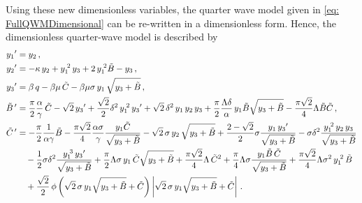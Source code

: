 Using these new dimensionless variables, the quarter wave model given in \cref{eq: FullQWMDimensional} can be re-written in a dimensionless form. Hence, the dimensionless quarter-wave model is described by
~
\begin{equation} \label{eq: FullQWMDimensionless}
\begin{split}
    \dash{y_1} &= y_2 \, , \\
    \dash{y_2} &= - \kappa \, y_2 + y_1\power{2} \, y_3 + 2 \, y_1\power{2} \tilde{B} - y_3 \, , \\
    \dash{y_3} &= \beta \, q - \beta \mu \, \tilde{C} - \beta \mu \sigma \, y_1 \, \sqrt{y_3 + \tilde{B}} \, , \\
    \dash{\tilde{B}\,} &= \frac{\pi}{2} \frac{\alpha}{\gamma} \, \tilde{C} - \sqrt{2} \, \dash{y_3} + \frac{\sqrt{2}}{2} \delta^2 \, y_1\power{2} \, \dash{y_3} + \sqrt{2} \, \delta^2 \, y_1 \, y_2 \, y_3 + \frac{\pi}{2} \frac{\Lambda \delta}{\alpha} \, y_1 \tilde{B} \sqrt{y_3 + \tilde{B}} - \frac{\pi \sqrt{2}}{4} \Lambda \tilde{B} \tilde{C} \, , \\
    \dash{\tilde{C}\,} &=
    - \frac{\pi}{2} \frac{1}{\alpha \gamma} \tilde{B}
    - \frac{\pi \sqrt{2}}{4} \frac{\alpha \sigma}{\gamma} \frac{y_1 \tilde{C}}{\sqrt{y_3 + \tilde{B}}}
    - \sqrt{2} \, \sigma \, y_2 \, \sqrt{y_3 + \tilde{B}}
    + \frac{2-\sqrt{2}}{2} \sigma \frac{y_1 \, \dash{y_3}}{\sqrt{y_3 + \tilde{B}}}
    - \sigma \delta^2 \frac{y_1\power{2} \, y_2 \, y_3}{\sqrt{y_3 + \tilde{B}}}
    \\ & \quad %
    - \frac{1}{2} \sigma \delta^2 \frac{y_1\power{3} \, \dash{y_3}}{\sqrt{y_3 + \tilde{B}}}
    + \frac{\pi}{2} \Lambda \sigma \, y_1 \, \tilde{C} \sqrt{y_3 + \tilde{B}}
    + \frac{\pi \sqrt{2}}{4} \Lambda \, \tilde{C}^2
    + \frac{\pi}{4} \Lambda \sigma \frac{y_1 \tilde{B} \, \tilde{C}}{\sqrt{y_3 + \tilde{B}}}
    + \frac{\pi \sqrt{2}}{4} \Lambda \sigma^2 \, y_1\power{2} \, \tilde{B}
    \\ & \quad %
    + \frac{\sqrt{2}}{2} \, \phi \left( \sqrt{2} \, \sigma \, y_1 \sqrt{y_3 + \tilde{B}} + \tilde{C} \right) \left| \sqrt{2} \, \sigma \, y_1 \sqrt{y_3 + \tilde{B}} + \tilde{C} \right| \, .
\end{split}
\end{equation}

